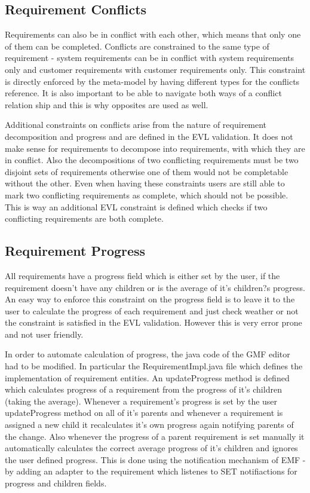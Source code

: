 \documentclass[11pt,a4paper]{article}
\begin{document}
	\subsection{Requirement Conflicts}
	Requirements can also be in conflict with each other, which means that only one of them can be completed. Conflicts are constrained to the same type of requirement - system requirements can be in conflict with system requirements only and customer requirements with customer requirements only. This constraint is directly enforced by the meta-model by having different types for the conflicts reference. It is also important to be able to navigate both ways of a conflict relation ship and this is why opposites are used as well. 
	
	Additional constraints on conflicts arise from the nature of requirement decomposition and progress and are defined in the EVL validation. It does not make sense for requirements to decompose into requirements, with which they are in conflict. Also the decompositions of two conflicting requirements must be two disjoint sets of requirements otherwise one of them would not be completable without the other. Even when having these constraints users are still able to mark two conflicting requirements as complete, which should not be possible. This is way an additional EVL constraint is defined which checks if two conflicting requirements are both complete.
	
	\subsection{Requirement Progress}
	All requirements have a progress field which is either set by the user, if the requirement doesn't have any children or is the average of it's children?s progress. An easy way to enforce this constraint on the progress field is to leave it to the user to calculate the progress of each requirement and just check weather or not the constraint is satisfied in the EVL validation. However this is very error prone and not user friendly. 
	
	In order to automate calculation of progress, the java code of the GMF editor had to be modified. In particular the RequirementImpl.java file which defines the implementation of requirement entities. An updateProgress method is defined which calculates progress of a requirement from the progress of it's children (taking the average). Whenever a requirement's progress is set by the user  updateProgress method on all of it's parents and whenever a requirement is assigned a new child it recalculates it's own progress again notifying parents of the change. Also whenever the progress of a parent requirement is set manually it automatically calculates the correct average progress of it's children and ignores the user defined progress. This is done using the notification mechanism of EMF \cite{emf} - by adding an adapter to the requirement which listenes to SET notifiactions for progress and children fields. 
	
\end{document}
